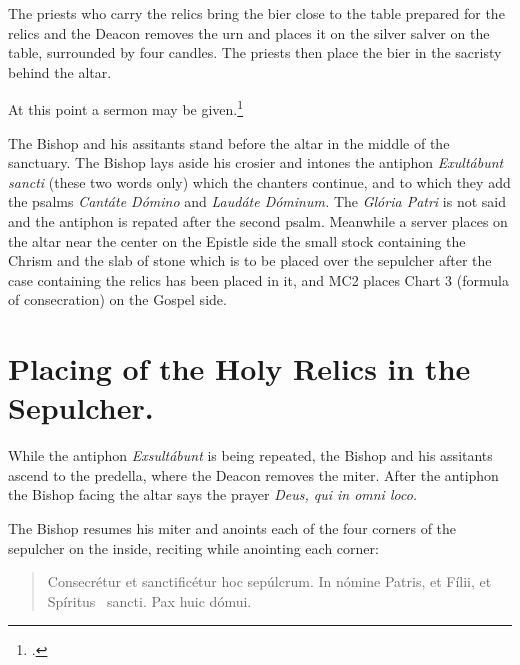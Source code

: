 \documentclass[letterpaper]{report}
\newcommand\src{\textsc{S.R.C.}}
\begin{document}
{    \rubric The priests who carry the relics bring the bier close to the table
    prepared for the relics and the Deacon removes the urn and places it on the
    silver salver on the table, surrounded by four candles. The priests then
    place the bier in the sacristy behind the altar.

    \rubric At this point a sermon may be given.\footcite[The exhortation
    here spoken of, the decrees of the Council of Trent which according to the
    Pontifical are now read by the archdeacon (any priest), the address of the
    Bishop to the founder of the church and the latter's reply may be omitted.
    --- \src, May 17, 1890, n. 3729 ad VIII.][footnote 2, p. 82.]{consecranda}

    \rubric The Bishop and his assitants stand before the altar in the middle
    of the sanctuary. The Bishop lays aside his crosier and intones the
    antiphon \textit{Exult\'abunt sancti} (these two words only) which the
    chanters continue, and to which they add the psalms \textit{Cant\'ate
    D\'omino} and \textit{Laud\'ate D\'ominum.} The \textit{Gl\'oria Patri} is
    not said and the antiphon is repated after the second psalm. Meanwhile a
    server places on the altar near the center on the Epistle side the small
    stock containing the Chrism and the slab of stone which is to be placed
    over the sepulcher after the case containing the relics has been placed in
    it, and MC2 places Chart 3 (formula of consecration) on the Gospel side.

    \section{Placing of the Holy Relics in the Sepulcher.}

    \rubric While the antiphon \textit{Exsult\'abunt} is being repeated, the
    Bishop and his assitants ascend to the predella, where the Deacon removes
    the miter. After the antiphon the Bishop facing the altar says the prayer
    \textit{Deus, qui in omni loco.}

    \rubric The Bishop resumes his miter and anoints each of the four corners
    of the sepulcher on the inside, reciting while anointing each corner:

    \begin{quote}
        Conse\cross crétur et sancti\cross ficétur hoc sepúlcrum. In nómine
        Pa\cross tris, et Fí\cross lii, et Spíritus \cross\ sancti. Pax huic
        dómui.
    \end{quote}

}
\end{document}
